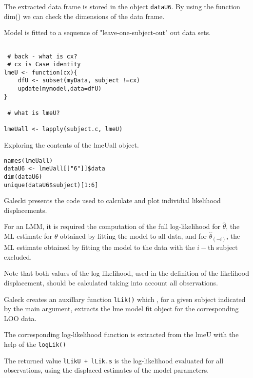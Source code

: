 \documentclass[a4paper,12pt]{article}
\begin{document}
The extracted data frame is stored in the object \texttt{dataU6}. By using the function dim() we can check the dimensions of the data frame.



Model is fitted to a sequence of "leave-one-subject-out" out data sets.


\begin{framed}
\begin{verbatim}

 # back - what is cx?
 # cx is Case identity
lmeU <- function(cx){
	dfU <- subset(myData, subject !=cx)
	update(mymodel,data=dfU)
}

 # what is lmeU?

lmeUall <- lapply(subject.c, lmeU)
\end{verbatim}
\end{framed}
Exploring the contents of the lmeUall object.
\begin{framed}
\begin{verbatim}
names(lmeUall)
dataU6 <- lmeUall[["6"]]$data
dim(dataU6)
unique(dataU6$subject)[1:6]
\end{verbatim}
\end{framed}

Galecki presents the code used to calculate and plot individial likelihood displacements.

For an LMM, it is required the computation of the full log-likelihood for \textbf{$\hat{\theta}$}, the ML estimate for 
\textbf{$\theta$} obtained by fitting the model to all data, and for \textbf{$\hat{\theta}_(-i)$}, the ML estimate obtained
by fitting the model to the data with the $i-$th subject excluded.

Note that both values of the log-likelihood, used in the definition of the likelihood displacement, should be 
calculated taking into account all observations.



Galeck creates an auxillary function \texttt{lLik()} which , for a given subject indicated by the main argument, extracts the lme model fit object for the
corresponding LOO data.


The corresponding log-likelihood function is extracted from the lmeU with the help of the \texttt{logLik()}


The returned value \texttt{lLikU + lLik.s} is the log-likelihood evaluated for all observations, using the displaced estimates of the model parameters.
\end{document}
